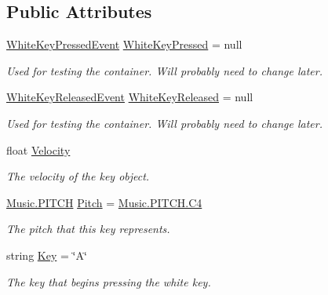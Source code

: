 \subsection*{Public Attributes}
\begin{DoxyCompactItemize}
\item 
\hyperlink{group___white_key_event_types_class_white_key_1_1_white_key_pressed_event}{White\+Key\+Pressed\+Event} \hyperlink{group___white_key_events_gab84691fc1e9f7b62884589d1813433e2}{White\+Key\+Pressed} = null
\begin{DoxyCompactList}\small\item\em Used for testing the container. Will probably need to change later. \end{DoxyCompactList}\item 
\hyperlink{group___white_key_event_types_class_white_key_1_1_white_key_released_event}{White\+Key\+Released\+Event} \hyperlink{group___white_key_events_ga180e88cd7ab95af43231f53469e87830}{White\+Key\+Released} = null
\begin{DoxyCompactList}\small\item\em Used for testing the container. Will probably need to change later. \end{DoxyCompactList}\item 
float \hyperlink{group___white_key_pub_var_gacecf2bff47104955b5dae63840443744}{Velocity}
\begin{DoxyCompactList}\small\item\em The velocity of the key object. \end{DoxyCompactList}\item 
\hyperlink{group___music_enums_ga508f69b199ea518f935486c990edac1d}{Music.\+P\+I\+T\+CH} \hyperlink{group___white_key_pub_var_ga1ddd98b85ba069defc7cf47d25f625f4}{Pitch} = \hyperlink{group___music_enums_gga508f69b199ea518f935486c990edac1dab713e6323a68d3ddabf4855826c50148}{Music.\+P\+I\+T\+C\+H.\+C4}
\begin{DoxyCompactList}\small\item\em The pitch that this key represents. \end{DoxyCompactList}\item 
string \hyperlink{group___white_key_pub_var_gab24447e9dd54dbb443a0869b954fef66}{Key} = \char`\"{}A\char`\"{}
\begin{DoxyCompactList}\small\item\em The key that begins pressing the white key. \end{DoxyCompactList}\end{DoxyCompactItemize}

